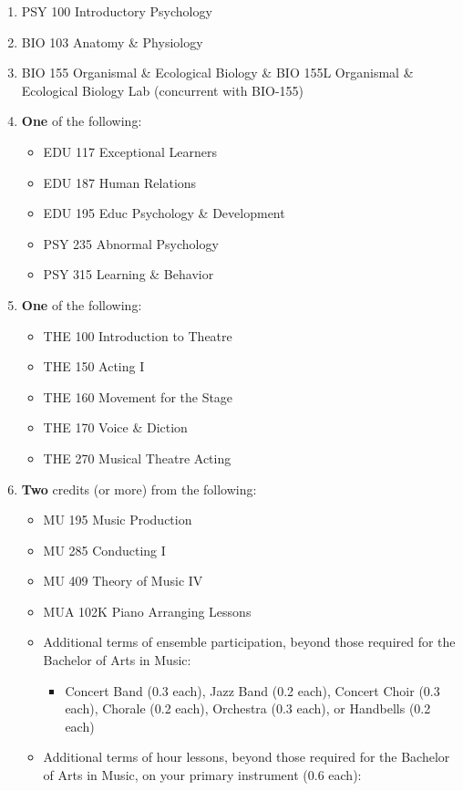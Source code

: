 \documentclass[
  letterpaper,
]{scrbook}
\providecommand{\tightlist}{%
  \setlength{\itemsep}{0pt}\setlength{\parskip}{0pt}}
\begin{document}
\begin{enumerate}
\def\labelenumi{\arabic{enumi}.}
\tightlist
\item
  PSY 100 Introductory Psychology
\item
  BIO 103 Anatomy \& Physiology
\item
  BIO 155 Organismal \& Ecological Biology \& BIO 155L Organismal \&
  Ecological Biology Lab (concurrent with BIO-155)
\item
  \textbf{One} of the following:

  \begin{itemize}
  \tightlist
  \item
    EDU 117 Exceptional Learners
  \item
    EDU 187 Human Relations
  \item
    EDU 195 Educ Psychology \& Development
  \item
    PSY 235 Abnormal Psychology
  \item
    PSY 315 Learning \& Behavior
  \end{itemize}
\item
  \textbf{One} of the following:

  \begin{itemize}
  \tightlist
  \item
    THE 100 Introduction to Theatre
  \item
    THE 150 Acting I
  \item
    THE 160 Movement for the Stage
  \item
    THE 170 Voice \& Diction
  \item
    THE 270 Musical Theatre Acting
  \end{itemize}
\item
  \textbf{Two} credits (or more) from the following:

  \begin{itemize}
  \tightlist
  \item
    MU 195 Music Production
  \item
    MU 285 Conducting I
  \item
    MU 409 Theory of Music IV
  \item
    MUA 102K Piano Arranging Lessons
  \item
    Additional terms of ensemble participation, beyond those required
    for the Bachelor of Arts in Music:

    \begin{itemize}
    \tightlist
    \item
      Concert Band (0.3 each), Jazz Band (0.2 each), Concert Choir (0.3
      each), Chorale (0.2 each), Orchestra (0.3 each), or Handbells (0.2
      each)
    \end{itemize}
  \item
    Additional terms of hour lessons, beyond those required for the
    Bachelor of Arts in Music, on your primary instrument (0.6 each):


\end{itemize}
\end{enumerate}
\end{document}
